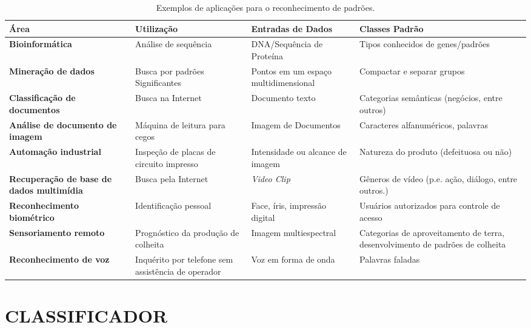  \begin{table}[htb]
	\ABNTEXfontereduzida
	\caption[\footnotesize Exemplos de aplicações para o reconhecimento de padrões.]{\footnotesize Exemplos de aplicações para o reconhecimento de padrões.}
	\label{tab:padrao}
	\begin{tabular}{p{3cm}|p{3cm}|p{4cm}|p{4cm}}
		\hline
		\textbf{Área} & \textbf{Utilização} & \textbf{Entradas de Dados} & \textbf{Classes Padrão} \\
		\hline \hline
		\textbf{Bioinformática} & Análise de sequência	& DNA/Sequência de Proteína	& Tipos conhecidos de genes/padrões \\
		\hline
		\textbf{Mineração de dados} & Busca por padrões Significantes & Pontos em um espaço multidimensional & Compactar e separar grupos \\
		\hline
		\textbf{Classificação de documentos} & Busca na Internet & Documento texto & Categorias semânticas (negócios, entre outros) \\
		\hline
		\textbf{Análise de documento de imagem} & Máquina de leitura para cegos & Imagem de Documentos & Caracteres alfanuméricos, palavras \\
		\hline
		\textbf{Automação industrial} & Inspeção de placas de circuito impresso & Intensidade ou alcance de imagem & Natureza do produto (defeituosa ou não) \\ 
		\hline
		\textbf{Recuperação de base de dados multimídia} & Busca pela Internet & \textit{Video Clip} & Gêneros de vídeo (p.e. ação, diálogo, entre outros.) \\
		\hline
		\textbf{Reconhecimento biométrico} & Identificação pessoal & Face, íris, impressão digital & Usuários autorizados para controle de acesso \\
		\hline
		\textbf{Sensoriamento remoto} & Prognóstico da produção de colheita & Imagem multiespectral & Categorias de aproveitamento de terra, desenvolvimento de padrões de colheita \\
		\hline
		\textbf{Reconhecimento de voz} & Inquérito por telefone sem assistência de operador & Voz em forma de onda & Palavras faladas \\
		\hline \hline
	\end{tabular}
\end{table} 

\section{\uppercase{Classificador}}

